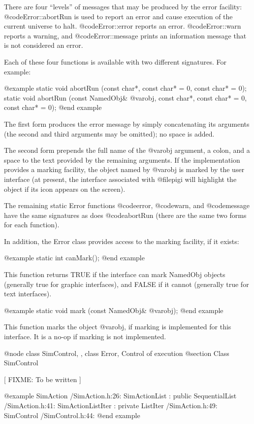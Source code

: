 There are four ``levels'' of messages that may be produced by the error
facility: @code{Error::abortRun} is used to report an error and cause execution
of the current universe to halt.
@code{Error::error} reports an error.
@code{Error::warn} reports a warning, and @code{Error::message} prints
an information message that is not considered an error.

Each of these four functions is available with two different signatures.
For example:

@example
static void abortRun (const char*, const char* = 0, const char* = 0);
static void abortRun (const NamedObj& @var{obj}, const char*, const char* = 0,
                      const char* = 0);
@end example

The first form produces the error message by simply concatenating its
arguments (the second and third arguments may be omitted); no space is
added.

The second form prepends the full name of the @var{obj} argument, a
colon, and a space to the text provided by the remaining arguments.
If the implementation provides a marking facility, the object named
by @var{obj} is marked by the user interface (at present, the interface
associated with @file{pigi} will highlight the object if its icon
appears on the screen).

The remaining static Error functions @code{error}, @code{warn}, and
@code{message} have the same signatures as does @code{abortRun} (there
are the same two forms for each function).

In addition, the Error class provides access to the marking facility,
if it exists:

@example
static int canMark();
@end example

This function returns TRUE if the interface can mark NamedObj objects
(generally true for graphic interfaces), and FALSE if it cannot
(generally true for text interfaces).

@example
static void mark (const NamedObj& @var{obj});
@end example

This function marks the object @var{obj}, if marking is implemented for
this interface.  It is a no-op if marking is not implemented.

@node class SimControl,  , class Error, Control of execution
@section Class SimControl

[ FIXME: To be written ]

@example
SimAction /SimAction.h:26:
SimActionList : public SequentialList /SimAction.h:41:
SimActionListIter : private ListIter /SimAction.h:49:
SimControl /SimControl.h:44:
@end example

